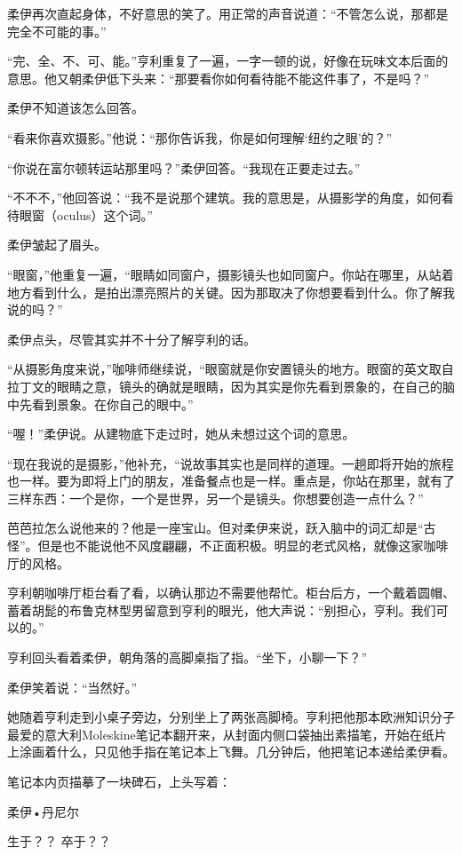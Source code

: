 柔伊再次直起身体，不好意思的笑了。用正常的声音说道：“不管怎么说，那都是完全不可能的事。”

“完、全、不、可、能。”亨利重复了一遍，一字一顿的说，好像在玩味文本后面的意思。他又朝柔伊低下头来：“那要看你如何看待能不能这件事了，不是吗？”

柔伊不知道该怎么回答。

“看来你喜欢摄影。”他说：“那你告诉我，你是如何理解‘纽约之眼’的？”

“你说在富尔顿转运站那里吗？”柔伊回答。“我现在正要走过去。”

“不不不，”他回答说：“我不是说那个建筑。我的意思是，从摄影学的角度，如何看待眼窗（oculus）这个词。”

柔伊皱起了眉头。

“眼窗，”他重复一遍，“眼睛如同窗户，摄影镜头也如同窗户。你站在哪里，从站着地方看到什么，是拍出漂亮照片的关键。因为那取决了你想要看到什么。你了解我说的吗？”

柔伊点头，尽管其实并不十分了解亨利的话。

“从摄影角度来说，”咖啡师继续说，“眼窗就是你安置镜头的地方。眼窗的英文取自拉丁文的眼睛之意，镜头的确就是眼睛，因为其实是你先看到景象的，在自己的脑中先看到景象。在你自己的眼中。”

“喔！”柔伊说。从建物底下走过时，她从未想过这个词的意思。

“现在我说的是摄影，”他补充，“说故事其实也是同样的道理。一趟即将开始的旅程也一样。要为即将上门的朋友，准备餐点也是一样。重点是，你站在那里，就有了三样东西：一个是你，一个是世界，另一个是镜头。你想要创造一点什么？”

芭芭拉怎么说他来的？他是一座宝山。但对柔伊来说，跃入脑中的词汇却是“古怪”。但是也不能说他不风度翩翩，不正面积极。明显的老式风格，就像这家咖啡厅的风格。

亨利朝咖啡厅柜台看了看，以确认那边不需要他帮忙。柜台后方，一个戴着圆帽、蓄着胡髭的布鲁克林型男留意到亨利的眼光，他大声说：“别担心，亨利。我们可以的。”

亨利回头看着柔伊，朝角落的高脚桌指了指。“坐下，小聊一下？”

柔伊笑着说：“当然好。”

她随着亨利走到小桌子旁边，分别坐上了两张高脚椅。亨利把他那本欧洲知识分子最爱的意大利Moleskine笔记本翻开来，从封面内侧口袋抽出素描笔，开始在纸片上涂画着什么，只见他手指在笔记本上飞舞。几分钟后，他把笔记本递给柔伊看。

笔记本内页描摹了一块碑石，上头写着：

{\kaishu 柔伊•丹尼尔}

{\kaishu 生于？？ 卒于？？}

